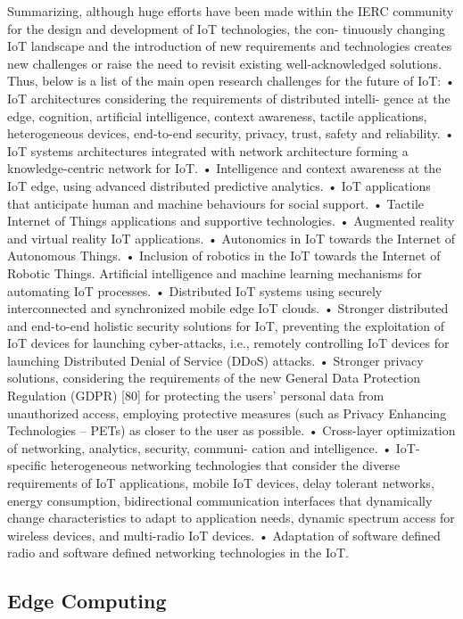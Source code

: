 Summarizing, although huge efforts have been made within the IERC
community for the design and development of IoT technologies, the con-
tinuously changing IoT landscape and the introduction of new requirements
and technologies creates new challenges or raise the need to revisit existing
well-acknowledged solutions. Thus, below is a list of the main open research
challenges for the future of IoT:
• IoT architectures considering the requirements of distributed intelli-
gence at the edge, cognition, artificial intelligence, context awareness,
tactile applications, heterogeneous devices, end-to-end security, privacy,
trust, safety and reliability.
• IoT systems architectures integrated with network architecture forming
a knowledge-centric network for IoT.
• Intelligence and context awareness at the IoT edge, using advanced
distributed predictive analytics.
• IoT applications that anticipate human and machine behaviours for
social support.
• Tactile Internet of Things applications and supportive technologies.
• Augmented reality and virtual reality IoT applications.
• Autonomics in IoT towards the Internet of Autonomous Things.
• Inclusion of robotics in the IoT towards the Internet of Robotic Things.
Artificial intelligence and machine learning mechanisms for automating
IoT processes.
• Distributed IoT systems using securely interconnected and synchronized
mobile edge IoT clouds.
• Stronger distributed and end-to-end holistic security solutions for IoT,
preventing the exploitation of IoT devices for launching cyber-attacks,
i.e., remotely controlling IoT devices for launching Distributed Denial
of Service (DDoS) attacks.
• Stronger privacy solutions, considering the requirements of the new
General Data Protection Regulation (GDPR) [80] for protecting the
users’ personal data from unauthorized access, employing protective
measures (such as Privacy Enhancing Technologies – PETs) as closer
to the user as possible.
• Cross-layer optimization of networking, analytics, security, communi-
cation and intelligence.
• IoT-specific heterogeneous networking technologies that consider the
diverse requirements of IoT applications, mobile IoT devices, delay
tolerant networks, energy consumption, bidirectional communication
interfaces that dynamically change characteristics to adapt to application
needs, dynamic spectrum access for wireless devices, and multi-radio
IoT devices.
• Adaptation of software defined radio and software defined networking
technologies in the IoT.


\subsection{Edge Computing}

